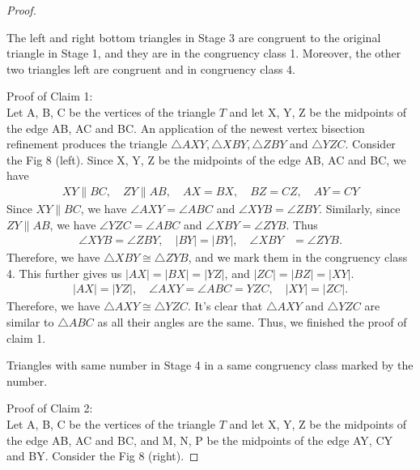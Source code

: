 \begin{proof}
    \begin{claim}
    The left and right bottom triangles in Stage 3 are congruent to the original triangle in Stage 1, and they are in the congruency class 1. Moreover, the other two triangles left are congruent and in congruency class 4.
    \end{claim}
    \noindent
    Proof of Claim 1: \\
    Let A, B, C be the vertices of the triangle $T$ and let X, Y, Z be the midpoints of the edge AB, AC and BC. An application of the newest vertex bisection refinement produces the triangle $\triangle{AXY}, \triangle{XBY}, \triangle{ZBY}$ and $\triangle{YZC}$. Consider the Fig 8 (left).
    Since X, Y, Z be the midpoints of the edge AB, AC and BC, we have 
    \begin{align*}
     XY \parallel BC,
     \quad 
     ZY \parallel AB,
     \quad 
     AX = BX, 
     \quad 
     BZ = CZ, 
     \quad
     AY = CY
    \end{align*}
    Since $XY\parallel BC$, we have $\angle{AXY} = \angle{ABC}$ and $\angle{XYB} = \angle{ZBY}$. Similarly, since $ZY\parallel AB$, we have $\angle{YZC} = \angle{ABC}$ and $\angle{XBY} = \angle{ZYB}$. Thus 
    \begin{align*}
    \angle{XYB} = \angle{ZBY},
    \quad
    |BY| = |BY|,
    \quad
    \angle{XBY} &= \angle{ZYB}.
    \end{align*}
    Therefore, we have $\triangle{XBY} \cong \triangle{ZYB}$, and we mark them in the congruency class 4. This further gives us $|AX| = |BX| = |YZ|$, and $|ZC| = |BZ| = |XY|$.
    \begin{align*}
    |AX| = |YZ|,
    \quad
    \angle{AXY} = \angle{ABC} = {YZC},
    \quad
    |XY| = |ZC|.
    \end{align*}
    Therefore, we have $\triangle{AXY} \cong \triangle{YZC}$. It's clear that $\triangle{AXY}$ and $\triangle{YZC}$ are similar to $\triangle{ABC}$ as all their angles are the same. Thus, we finished the proof of claim 1.


    \begin{claim}
    Triangles with same number in Stage 4 in a same congruency class marked by the number.
    \end{claim}
    \noindent
    Proof of Claim 2: \\
    Let A, B, C be the vertices of the triangle $T$ and let X, Y, Z be the midpoints of the edge AB, AC and BC, and M, N, P be the midpoints of the edge AY, CY and BY. Consider the Fig 8 (right).
 

\end{proof}
